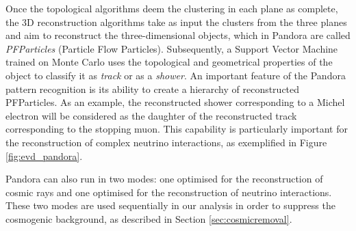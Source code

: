 Once the topological algorithms deem the clustering in each plane as complete, the 3D reconstruction algorithms take as input the clusters from the three planes and aim to reconstruct the three-dimensional objects, which in Pandora are called \emph{PFParticles} (Particle Flow Particles).
Subsequently, a Support Vector Machine trained on Monte Carlo uses the topological and geometrical properties of the object to classify it as \emph{track} or as a \emph{shower}. 
An important feature of the Pandora pattern recognition is its ability to create a hierarchy of reconstructed PFParticles. As an example, the reconstructed shower corresponding to a Michel electron will be considered as the daughter of the reconstructed track corresponding to the stopping muon. This capability is particularly important for the reconstruction of complex neutrino interactions, as exemplified in Figure \ref{fig:evd_pandora}.

Pandora can also run in two modes: one optimised for the reconstruction of cosmic rays and one optimised for the reconstruction of neutrino interactions. These two modes are used sequentially in our analysis in order to suppress the cosmogenic background, as described in Section \ref{sec:cosmicremoval}.